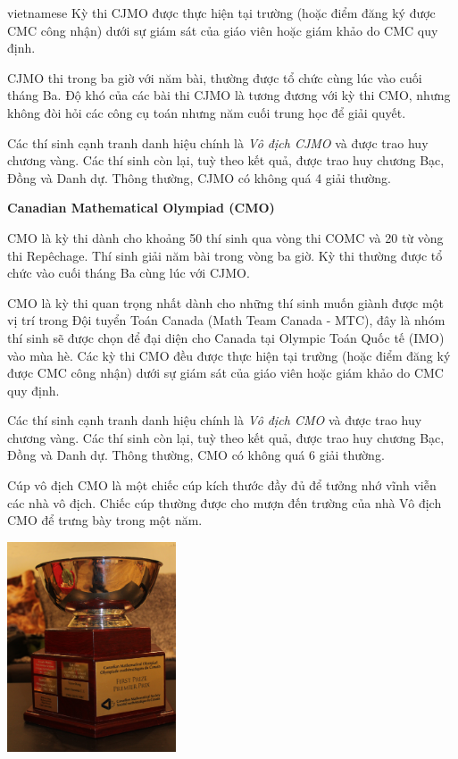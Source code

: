 \documentclass{article}
\begin{document}
\begin{otherlanguage*}{vietnamese}
Kỳ thi CJMO được thực hiện tại trường (hoặc điểm đăng ký được CMC công nhận) dưới sự giám sát của giáo viên hoặc giám khảo do CMC quy định.

CJMO thi trong ba giờ với năm bài, thường được tổ chức cùng lúc vào cuối tháng Ba.
Độ khó của các bài thi CJMO là tương đương với kỳ thi CMO, nhưng không đòi hỏi các công cụ toán nhưng năm cuối trung học để giải quyết.

Các thí sinh cạnh tranh danh hiệu chính là \textit{Vô địch CJMO} và được trao huy chương vàng. Các thí sinh còn lại, tuỳ theo kết quả, được trao huy chương Bạc, Đồng và Danh dự.
Thông thường, CJMO có không quá 4 giải thường.

\newpage
\textbf{Canadian Mathematical Olympiad (CMO)}

CMO là kỳ thi dành cho khoảng 50 thí sinh qua vòng thi COMC và 20 từ vòng thi Repêchage. Thí sinh giải năm bài trong vòng ba giờ.
Kỳ thi thường được tổ chức vào cuối tháng Ba cùng lúc với CJMO.

CMO là kỳ thi quan trọng nhất dành cho những thí sinh muốn giành được một vị trí trong Đội tuyển Toán Canada (Math Team Canada - MTC),
đây là nhóm thí sinh sẽ được chọn để đại diện cho Canada tại Olympic Toán Quốc tế (IMO) vào mùa hè. 
Các kỳ thi CMO đều được thực hiện tại trường (hoặc điểm đăng ký được CMC công nhận) dưới sự giám sát của giáo viên hoặc giám khảo do CMC quy định.

Các thí sinh cạnh tranh danh hiệu chính là \textit{Vô địch CMO} và được trao huy chương vàng. Các thí sinh còn lại, tuỳ theo kết quả, được trao huy chương Bạc, Đồng và Danh dự.
Thông thường, CMO có không quá 6 giải thường.

Cúp vô địch CMO là một chiếc cúp kích thước đầy đủ để tưởng nhớ vĩnh viễn các nhà vô địch. 
Chiếc cúp thường được cho mượn đến trường của nhà Vô địch CMO để trưng bày trong một năm.

\begin{center}
    \includegraphics[width=5cm]{./png/cmo-trophy-2022.png}
\end{center}


\end{otherlanguage*}
\end{document}

